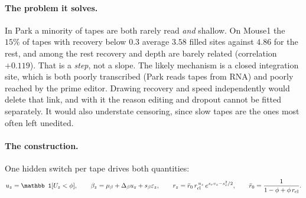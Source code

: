 \paragraph{The problem it solves.} In Park a minority of tapes are both rarely read \emph{and}
shallow. On Mouse1 the $15\%$ of tapes with recovery below $0.3$ average $3.58$ filled sites against
$4.86$ for the rest, and among the rest recovery and depth are barely related (correlation
$+0.119$). That is a \emph{step}, not a slope. The likely mechanism is a closed integration site,
which is both poorly transcribed (Park reads tapes from RNA) and poorly reached by the prime editor.
Drawing recovery and speed independently would delete that link, and with it the reason editing
and dropout cannot be fitted separately. It would also understate censoring, since slow tapes are
the ones most often left unedited.

\paragraph{The construction.} One hidden switch per tape drives both quantities:
\begin{equation}
  u_z=\mathbb 1[U_z<\phi],\qquad
  \beta_z=\mu_\beta+\Delta_\beta u_z+s_\beta\varepsilon_z,\qquad
  r_z=\bar r_0\,r_{\rm cl}^{\,u_z}\,e^{s_rv_z-s_r^2/2},\qquad
  \bar r_0=\frac{1}{1-\phi+\phi\,r_{\rm cl}} .
  \label{eq:panel}
\end{equation}

